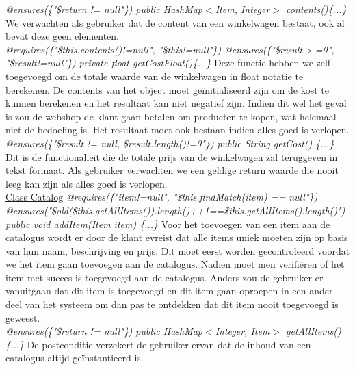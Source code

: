 \documentclass{article}
\begin{document}
\noindent
\textit{@ensures(\{"\$return != null"\})} \newline
\textit{public HashMap$<$Item, Integer$>$ contents()\{...\}} \newline
We verwachten als gebruiker dat de content van een winkelwagen bestaat, ook al bevat deze geen elementen.\\

\noindent
\textit{@requires(\{"\$this.contents()!=null", "\$this!=null"\})}\newline
\textit{@ensures(\{"\$result$>$=0", "\$result!=null"\})}\newline
\textit{private float getCostFloat()\{...\}}\newline
Deze functie hebben we zelf toegevoegd om de totale waarde van de winkelwagen in float notatie te berekenen. De contents van het object moet geïnitialiseerd zijn om de kost te kunnen berekenen en het resultaat kan niet negatief zijn. Indien dit wel het geval is zou de webshop de klant gaan betalen om producten te kopen, wat helemaal niet de bedoeling is. Het resultaat moet ook bestaan indien alles goed is verlopen.\\

\noindent
\textit{@ensures(\{"\$result != null, \$result.length()!=0"\})}\newline
\textit{public String getCost() \{...\}}\newline
Dit is de functionalieit die de totale prijs van de winkelwagen zal teruggeven in tekst formaat. Als gebruiker verwachten we een geldige return waarde die nooit leeg kan zijn als alles goed is verlopen.\\

\noindent
\underline{Class Catalog}\newline
\textit{@requires(\{"item!=null", "\$this.findMatch(item) == null"\})}\newline
\textit{@ensures("\$old(\$this.getAllItems()).length()++1==\$this.getAllItems().length()")}\newline
\textit{public void addItem(Item item) \{...\}}\newline
Voor het toevoegen van een item aan de catalogus wordt er door de klant evreist dat alle items uniek moeten zijn op basis van hun naam, beschrijving en prijs. Dit moet eerst worden gecontroleerd voordat we het item gaan toevoegen aan de catalogus. Nadien moet men verifi\"{e}ren of het item met succes is toegevoegd aan de catalogus. Anders zou de gebruiker er vanuitgaan dat dit item is toegevoegd en dit item gaan oproepen in een ander deel van het systeem om dan pas te ontdekken dat dit item nooit toegevoegd is geweest.\\

\noindent
\textit{@ensures(\{"\$return != null"\})}\newline
\textit{public HashMap$<$Integer, Item$>$ getAllItems() \{...\}}\newline
De postconditie verzekert de gebruiker ervan dat de inhoud van een catalogus altijd ge\"{i}nstantieerd is.
\end{document}
